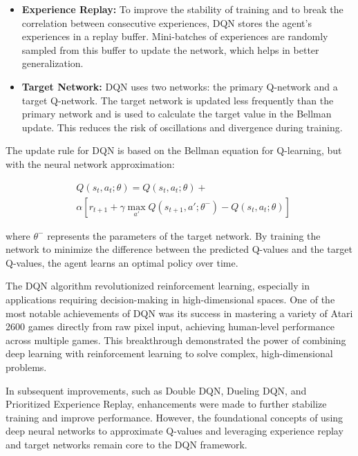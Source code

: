 \begin{itemize}
    \item \textbf{Experience Replay:} To improve the stability of training and to break the correlation between consecutive experiences, DQN stores the agent’s experiences in a replay buffer. Mini-batches of experiences are randomly sampled from this buffer to update the network, which helps in better generalization.
    \item \textbf{Target Network:} DQN uses two networks: the primary Q-network and a target Q-network. The target network is updated less frequently than the primary network and is used to calculate the target value in the Bellman update. This reduces the risk of oscillations and divergence during training.
\end{itemize}

The update rule for DQN is based on the Bellman equation for Q-learning, but
with the neural network approximation:

\begin{equation}
    \begin{split}
         & Q(s_t, a_t; \theta) = Q(s_t, a_t; \theta) +                                                     \\
         & \alpha \left[ r_{t+1} + \gamma \max_{a'} Q(s_{t+1}, a'; \theta^-) - Q(s_t, a_t; \theta) \right]
    \end{split}
\end{equation}

where \( \theta^- \) represents the parameters of the target network. By
training the network to minimize the difference between the predicted Q-values
and the target Q-values, the agent learns an optimal policy over
time.\cite{bg4}

The DQN algorithm revolutionized reinforcement learning, especially in
applications requiring decision-making in high-dimensional spaces. One of the
most notable achievements of DQN was its success in mastering a variety of
Atari 2600 games directly from raw pixel input, achieving human-level
performance across multiple games. This breakthrough demonstrated the power of
combining deep learning with reinforcement learning to solve complex,
high-dimensional problems.

In subsequent improvements, such as Double DQN, Dueling DQN, and Prioritized
Experience Replay, enhancements were made to further stabilize training and
improve performance. However, the foundational concepts of using deep neural
networks to approximate Q-values and leveraging experience replay and target
networks remain core to the DQN framework.
